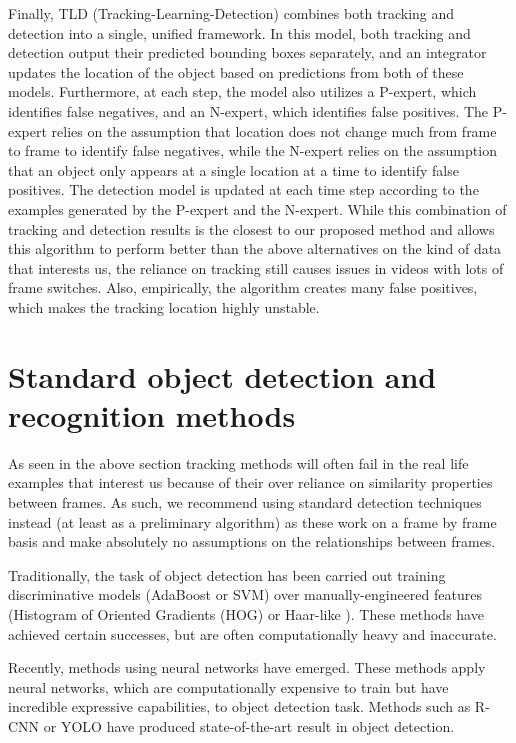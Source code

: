 \documentclass{article}
\begin{document}
Finally, TLD (Tracking-Learning-Detection) \cite{TLD} combines both tracking and detection into a single, unified framework.
In this model, both tracking and detection output their predicted bounding boxes
separately, and an integrator updates the location of the object based on
predictions from both of these models. Furthermore, at each step, the model
also utilizes a P-expert, which identifies false negatives, and an N-expert,
which identifies false positives. The P-expert relies on the assumption
that location does not change much from frame to frame to identify false negatives,
while the N-expert relies on the assumption that an object only appears at
a single location at a time to identify false positives. The detection model
is updated at each time step according to the examples generated by the P-expert and
the N-expert. While this combination of tracking and detection results is the closest to our proposed
method and allows this algorithm to perform better than the above alternatives on the kind of
data that interests us, the reliance on tracking still causes issues in videos with lots of frame switches.
Also, empirically, the algorithm creates many false positives, which makes the tracking location highly unstable.


\section{Standard object detection and recognition methods}

As seen in the above section tracking methods will often fail in the real life examples that interest us because of their over reliance
on similarity properties between frames. As such, we recommend using standard detection techniques instead (at least as a preliminary algorithm)
as these work on a frame by frame basis and make absolutely no assumptions on the relationships between frames.

Traditionally, the task of object detection has been carried out training
discriminative models (AdaBoost or SVM) over manually-engineered features (Histogram of Oriented Gradients (HOG) \cite{hog}
or Haar-like \cite{haar}). These methods have achieved certain successes, but
are often computationally heavy and inaccurate.

Recently, methods using neural networks have emerged. These methods apply neural
networks, which are computationally expensive to train but have incredible
expressive capabilities, to object detection task. Methods such as
R-CNN \cite{rcnn} or YOLO \cite{yolo} have produced state-of-the-art result
in object detection.
\end{document}
